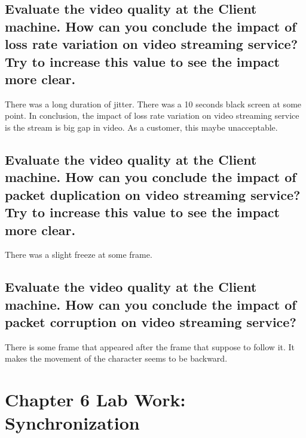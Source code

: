 \documentclass[11pt,a4paper]{report}
\begin{document}
	\section{Evaluate the video quality at the Client machine. How can you conclude the impact of loss rate variation on video streaming service? Try to increase this value to see the impact more clear.}
	There was a long duration of jitter. There was a 10 seconds black screen at some point.  In conclusion, the impact of loss rate variation on video streaming service is the stream is big gap in video. As a customer, this maybe unacceptable.
	
	\section{Evaluate the video quality at the Client machine. How can you conclude the impact of packet duplication on video streaming service? Try to increase this value to see the impact more clear.}
	There was a slight freeze at some frame.
	
	\section{Evaluate the video quality at the Client machine. How can you conclude the impact of packet corruption on video streaming service? }
	There is some frame that appeared after the frame that suppose to follow it. It makes the movement of the character seems to be backward.
	
	\chapter{Chapter 6 Lab Work: Synchronization}
	\newpage
\end{document}
